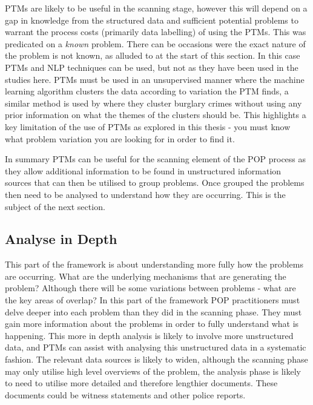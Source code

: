 PTMs are likely to be useful in the scanning stage, however this will depend on a gap in knowledge from the structured data and sufficient potential problems to warrant the process costs (primarily data labelling) of using the PTMs.  This was predicated on a \emph{known} problem. There can be occasions were the exact nature of the problem is not known, as alluded to at the start of this section. In this case PTMs and NLP techniques can be used, but not as they have been used in the studies here. PTMs must be used in an unsupervised manner where the machine learning algorithm clusters the data according to variation the PTM finds, a similar method is used by \textcite{birks2020unsupervised} where they cluster burglary crimes without using any prior information on what the themes of the clusters should be. This highlights a key limitation of the use of PTMs as explored in this thesis - you must know what problem variation you are looking for in order to find it.

In summary PTMs can be useful for the scanning element of the POP process as they allow additional information to be found in unstructured information sources that can then be utilised to group problems. Once grouped the problems then need to be analysed to understand how they are occurring. This is the subject of the next section. 


\subsection{Analyse in Depth} This part of the framework is about understanding more fully how the problems are occurring. What are the underlying mechanisms that are generating the problem? Although there will be some variations between problems - what are the key areas of overlap? In this part of the framework POP practitioners must delve deeper into each problem than they did in the scanning phase. They must gain more information about the problems in order to fully understand what is happening. This more in depth analysis is likely to involve more unstructured data, and PTMs can assist with analysing this unstructured data in a systematic fashion. The relevant data sources is likely to widen, although the scanning phase may only utilise high level overviews of the problem, the analysis phase is likely to need to utilise more detailed and therefore lengthier documents. These documents could be witness statements and other police reports.

